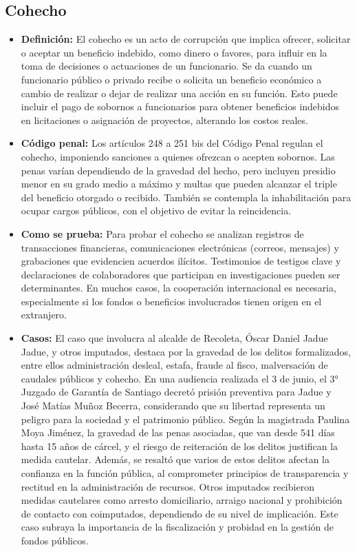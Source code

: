 \documentclass[letter,12pt]{article}
\begin{document}
	\subsection{Cohecho}
	\begin{itemize}
		\item \textbf{Definición: }El cohecho es un acto de corrupción que implica ofrecer, solicitar o aceptar un beneficio indebido, como dinero o favores, para influir en la toma de decisiones o actuaciones de un funcionario. Se da cuando un funcionario público o privado recibe o solicita un beneficio económico a cambio de realizar o dejar de realizar una acción en su función. Esto puede incluir el pago de sobornos a funcionarios para obtener beneficios indebidos en licitaciones o asignación de proyectos, alterando los costos reales.\\
		
		\item \textbf{Código penal: }Los artículos 248 a 251 bis del Código Penal regulan el cohecho, imponiendo sanciones a quienes ofrezcan o acepten sobornos. Las penas varían dependiendo de la gravedad del hecho, pero incluyen presidio menor en su grado medio a máximo y multas que pueden alcanzar el triple del beneficio otorgado o recibido. También se contempla la inhabilitación para ocupar cargos públicos, con el objetivo de evitar la reincidencia.\\
		
		\item \textbf{Como se prueba: }Para probar el cohecho se analizan registros de transacciones financieras, comunicaciones electrónicas (correos, mensajes) y grabaciones que evidencien acuerdos ilícitos. Testimonios de testigos clave y declaraciones de colaboradores que participan en investigaciones pueden ser determinantes. En muchos casos, la cooperación internacional es necesaria, especialmente si los fondos o beneficios involucrados tienen origen en el extranjero.\\
		
		\item \textbf{Casos: }El caso que involucra al alcalde de Recoleta, Óscar Daniel Jadue Jadue, y otros imputados, destaca por la gravedad de los delitos formalizados, entre ellos administración desleal, estafa, fraude al fisco, malversación de caudales públicos y cohecho. En una audiencia realizada el 3 de junio, el 3° Juzgado de Garantía de Santiago decretó prisión preventiva para Jadue y José Matías Muñoz Becerra, considerando que su libertad representa un peligro para la sociedad y el patrimonio público. Según la magistrada Paulina Moya Jiménez, la gravedad de las penas asociadas, que van desde 541 días hasta 15 años de cárcel, y el riesgo de reiteración de los delitos justifican la medida cautelar. Además, se resaltó que varios de estos delitos afectan la confianza en la función pública, al comprometer principios de transparencia y rectitud en la administración de recursos. Otros imputados recibieron medidas cautelares como arresto domiciliario, arraigo nacional y prohibición de contacto con coimputados, dependiendo de su nivel de implicación. Este caso subraya la importancia de la fiscalización y probidad en la gestión de fondos públicos.\\
		

\end{itemize}
\end{document}
